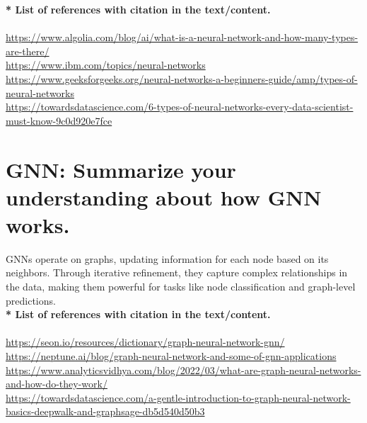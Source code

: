\documentclass{article}
\begin{document}
\textbf{* List of references with citation in the text/content.}\\
\\
\url{https://www.algolia.com/blog/ai/what-is-a-neural-network-and-how-many-types-are-there/}\\
\url{https://www.ibm.com/topics/neural-networks}\\
\url{https://www.geeksforgeeks.org/neural-networks-a-beginners-guide/amp/types-of-neural-networks}\\
\url{https://towardsdatascience.com/6-types-of-neural-networks-every-data-scientist-must-know-9c0d920e7fce}\\

\newpage

\section{GNN: Summarize your understanding about how GNN works.}

GNNs operate on graphs, updating information for each node based on its neighbors. Through iterative refinement, they capture complex relationships in the data, making them powerful for tasks like node classification and graph-level predictions.\\

\textbf{* List of references with citation in the text/content.}\\
\\
\url{https://seon.io/resources/dictionary/graph-neural-network-gnn/}\\
\url{https://neptune.ai/blog/graph-neural-network-and-some-of-gnn-applications}\\
\url{https://www.analyticsvidhya.com/blog/2022/03/what-are-graph-neural-networks-and-how-do-they-work/}\\
\url{https://towardsdatascience.com/a-gentle-introduction-to-graph-neural-network-basics-deepwalk-and-graphsage-db5d540d50b3}\\
\end{document}
